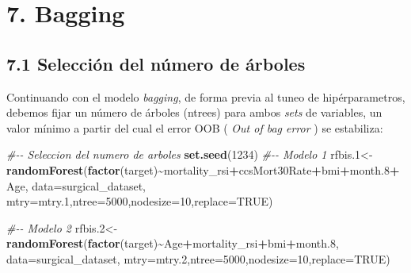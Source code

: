 \documentclass[
]{article}
\newenvironment{Shaded}{\begin{snugshade}}{\end{snugshade}}
\newcommand{\CommentTok}[1]{\textcolor[rgb]{0.56,0.35,0.01}{\textit{#1}}}
\newcommand{\DataTypeTok}[1]{\textcolor[rgb]{0.13,0.29,0.53}{#1}}
\newcommand{\DecValTok}[1]{\textcolor[rgb]{0.00,0.00,0.81}{#1}}
\newcommand{\FloatTok}[1]{\textcolor[rgb]{0.00,0.00,0.81}{#1}}
\newcommand{\KeywordTok}[1]{\textcolor[rgb]{0.13,0.29,0.53}{\textbf{#1}}}
\newcommand{\NormalTok}[1]{#1}
\newcommand{\OperatorTok}[1]{\textcolor[rgb]{0.81,0.36,0.00}{\textbf{#1}}}
\newcommand{\OtherTok}[1]{\textcolor[rgb]{0.56,0.35,0.01}{#1}}
\begin{document}
\hypertarget{bagging}{%
\section{7. Bagging}\label{bagging}}

\hypertarget{selecciuxf3n-del-nuxfamero-de-uxe1rboles}{%
\subsection{7.1 Selección del número de
árboles}\label{selecciuxf3n-del-nuxfamero-de-uxe1rboles}}

Continuando con el modelo \emph{bagging}, de forma previa al tuneo de
hipérparametros, debemos fijar un número de árboles (ntrees) para ambos
\emph{sets} de variables, un valor mínimo a partir del cual el error OOB
( \emph{Out of bag error} ) se estabiliza:

\begin{Shaded}
\begin{Highlighting}[]
\CommentTok{\#{-}{-} Seleccion del numero de arboles}
\KeywordTok{set.seed}\NormalTok{(}\DecValTok{1234}\NormalTok{)}
\CommentTok{\#{-}{-} Modelo 1}
\NormalTok{rfbis}\FloatTok{.1}\NormalTok{<{-}}\KeywordTok{randomForest}\NormalTok{(}\KeywordTok{factor}\NormalTok{(target)}\OperatorTok{\textasciitilde{}}\NormalTok{mortality\_rsi}\OperatorTok{+}\NormalTok{ccsMort30Rate}\OperatorTok{+}\NormalTok{bmi}\OperatorTok{+}\NormalTok{month}\FloatTok{.8}\OperatorTok{+}\NormalTok{Age,}
                      \DataTypeTok{data=}\NormalTok{surgical\_dataset,}
                      \DataTypeTok{mtry=}\NormalTok{mtry}\FloatTok{.1}\NormalTok{,}\DataTypeTok{ntree=}\DecValTok{5000}\NormalTok{,}\DataTypeTok{nodesize=}\DecValTok{10}\NormalTok{,}\DataTypeTok{replace=}\OtherTok{TRUE}\NormalTok{)}

\CommentTok{\#{-}{-} Modelo 2}
\NormalTok{rfbis}\FloatTok{.2}\NormalTok{<{-}}\KeywordTok{randomForest}\NormalTok{(}\KeywordTok{factor}\NormalTok{(target)}\OperatorTok{\textasciitilde{}}\NormalTok{Age}\OperatorTok{+}\NormalTok{mortality\_rsi}\OperatorTok{+}\NormalTok{bmi}\OperatorTok{+}\NormalTok{month}\FloatTok{.8}\NormalTok{,}
                      \DataTypeTok{data=}\NormalTok{surgical\_dataset,}
                      \DataTypeTok{mtry=}\NormalTok{mtry}\FloatTok{.2}\NormalTok{,}\DataTypeTok{ntree=}\DecValTok{5000}\NormalTok{,}\DataTypeTok{nodesize=}\DecValTok{10}\NormalTok{,}\DataTypeTok{replace=}\OtherTok{TRUE}\NormalTok{)}
\end{Highlighting}
\end{Shaded}
\end{document}
